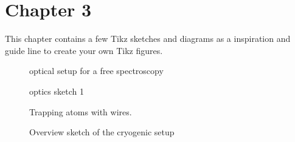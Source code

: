 \chapter{Chapter 3}\label{chap:chapter_3}
This chapter contains a few Tikz sketches and diagrams as a inspiration and guide line to create your own Tikz figures.

\begin{figure}[H]
	\centering
	\resizebox{\textwidth}{!}{
		\begin{tikzpicture}[use optics, scale=1.0]
			
		\end{tikzpicture}
	}
	\caption[DFS setup]{optical setup for a  free spectroscopy}
	\label{fig:dfs}
\end{figure}

\begin{figure}[H]
	\centering
	\begin{tikzpicture}[use optics, scale=0.7]
		
	\end{tikzpicture}
	\caption[optics sketch 1]{optics sketch 1}
	\label{fig:reflective_imaging_setup}
\end{figure}

\begin{figure}[H]
	\centering
	\begin{tikzpicture}[use optics, scale=0.7]
		
	\end{tikzpicture}
	\caption[trapping atoms wiht a wire]{Trapping atoms with wires.}
	\label{fig:trapping_atoms_with_a_wire}
\end{figure}

%		

\begin{figure}[H]
	\centering
	\begin{tikzpicture}[scale=0.48]
		
	\end{tikzpicture}
	\caption[overview of cryogenic setup]{Overview sketch of the cryogenic setup}
	\label{fig:cryogenic_overview}
\end{figure}

